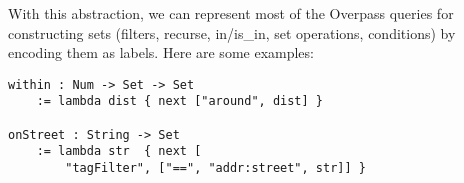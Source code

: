 \documentclass[main.tex]{subfiles}
\begin{document}
With this abstraction, we can represent most of the Overpass queries for
constructing sets (filters, recurse, in/is_in, set operations, conditions)
by encoding them as labels. Here are some examples:

\begin{lstlisting}
within : Num -> Set -> Set
    := lambda dist { next ["around", dist] }

onStreet : String -> Set
    := lambda str  { next [
        "tagFilter", ["==", "addr:street", str]] }
\end{lstlisting}
\end{document}
